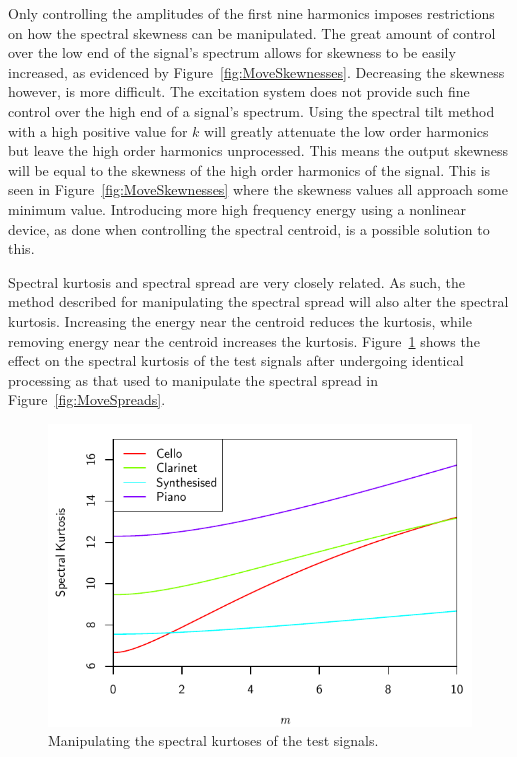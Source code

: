 			Only controlling the amplitudes of the first nine harmonics imposes restrictions on how the
			spectral skewness can be manipulated. The great amount of control over the low end of the signal's
			spectrum allows for skewness to be easily increased, as evidenced by
			Figure~\ref{fig:MoveSkewnesses}.  Decreasing the skewness however, is more difficult. The
			excitation system does not provide such fine control over the high end of a signal's spectrum.
			Using the spectral tilt method with a high positive value for $k$ will greatly attenuate the low
			order harmonics but leave the high order harmonics unprocessed. This means the output skewness will
			be equal to the skewness of the high order harmonics of the signal. This is seen in
			Figure~\ref{fig:MoveSkewnesses} where the skewness values all approach some minimum value.
			Introducing more high frequency energy using a nonlinear device, as done when controlling the
			spectral centroid, is a possible solution to this.

			Spectral kurtosis and spectral spread are very closely related. As such, the method described for
			manipulating the spectral spread will also alter the spectral kurtosis. Increasing the energy near
			the centroid reduces the kurtosis, while removing energy near the centroid increases the kurtosis.
			Figure~\ref{fig:MoveKurtoses} shows the effect on the spectral kurtosis of the test signals after
			undergoing identical processing as that used to manipulate the spectral spread in
			Figure~\ref{fig:MoveSpreads}.
			
			\begin{figure}[h!]
				\centering
				\includegraphics{chapter6/Images/MoveKurtoses.pdf}
				\caption{Manipulating the spectral kurtoses of the test signals.}
				\label{fig:MoveKurtoses}
			\end{figure}

